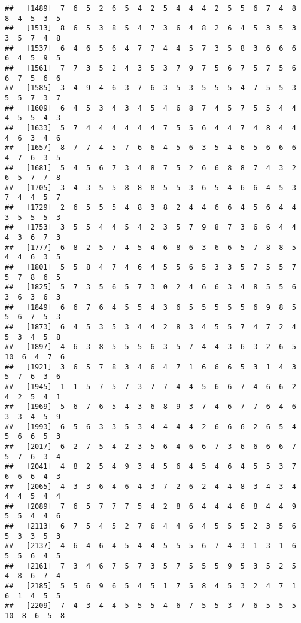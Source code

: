 \documentclass[
]{book}
\begin{document}
\begin{verbatim}
##   [1489]  7  6  5  2  6  5  4  2  5  4  4  4  2  5  5  6  7  4  8  8  4  5  3  5
##   [1513]  8  6  5  3  8  5  4  7  3  6  4  8  2  6  4  5  3  5  3  3  5  7  4  8
##   [1537]  6  4  6  5  6  4  7  7  4  4  5  7  3  5  8  3  6  6  6  6  4  5  9  5
##   [1561]  7  7  3  5  2  4  3  5  3  7  9  7  5  6  7  5  7  5  6  6  7  5  6  6
##   [1585]  3  4  9  4  6  3  7  6  3  5  3  5  5  5  4  7  5  5  3  5  5  7  3  7
##   [1609]  6  4  5  3  4  3  4  5  4  6  8  7  4  5  7  5  5  4  4  4  5  5  4  3
##   [1633]  5  7  4  4  4  4  4  4  7  5  5  6  4  4  7  4  8  4  4  4  6  3  4  6
##   [1657]  8  7  7  4  5  7  6  6  4  5  6  3  5  4  6  5  6  6  6  4  7  6  3  5
##   [1681]  5  4  5  6  7  3  4  8  7  5  2  6  6  8  8  7  4  3  2  6  5  7  7  8
##   [1705]  3  4  3  5  5  8  8  8  5  5  3  6  5  4  6  6  4  5  3  7  4  4  5  7
##   [1729]  2  6  5  5  5  4  8  3  8  2  4  4  6  6  4  5  6  4  4  3  5  5  5  3
##   [1753]  3  5  5  4  4  5  4  2  3  5  7  9  8  7  3  6  6  4  4  4  3  6  7  3
##   [1777]  6  8  2  5  7  4  5  4  6  8  6  3  6  6  5  7  8  8  5  4  4  6  3  5
##   [1801]  5  5  8  4  7  4  6  4  5  5  6  5  3  3  5  7  5  5  7  5  7  8  6  5
##   [1825]  5  7  3  5  6  5  7  3  0  2  4  6  6  3  4  8  5  5  6  3  6  3  6  3
##   [1849]  6  6  7  6  4  5  5  4  3  6  5  5  5  5  5  6  9  8  5  5  6  7  5  3
##   [1873]  6  4  5  3  5  3  4  4  2  8  3  4  5  5  7  4  7  2  4  5  3  4  5  8
##   [1897]  4  6  3  8  5  5  5  6  3  5  7  4  4  3  6  3  2  6  5 10  6  4  7  6
##   [1921]  3  6  5  7  8  3  4  6  4  7  1  6  6  6  5  3  1  4  3  5  7  6  3  6
##   [1945]  1  1  5  7  5  7  3  7  7  4  4  5  6  6  7  4  6  6  2  4  2  5  4  1
##   [1969]  5  6  7  6  5  4  3  6  8  9  3  7  4  6  7  7  6  4  6  3  3  4  5  9
##   [1993]  6  5  6  3  3  5  3  4  4  4  4  2  6  6  6  2  6  5  4  5  6  6  5  3
##   [2017]  6  2  7  5  4  2  3  5  6  4  6  6  7  3  6  6  6  6  7  5  7  6  3  4
##   [2041]  4  8  2  5  4  9  3  4  5  6  4  5  4  6  4  5  5  3  7  6  6  6  4  3
##   [2065]  4  3  3  6  4  6  4  3  7  2  6  2  4  4  8  3  4  3  4  4  4  5  4  4
##   [2089]  7  6  5  7  7  7  5  4  2  8  6  4  4  4  6  8  4  4  9  5  5  4  4  6
##   [2113]  6  7  5  4  5  2  7  6  4  4  6  4  5  5  5  2  3  5  6  5  3  3  5  3
##   [2137]  4  6  4  6  4  5  4  4  5  5  5  6  7  4  3  1  3  1  6  5  5  6  4  5
##   [2161]  7  3  4  6  7  5  7  3  5  7  5  5  5  9  5  3  5  2  5  4  8  6  7  4
##   [2185]  5  5  6  9  6  5  4  5  1  7  5  8  4  5  3  2  4  7  1  6  1  4  5  5
##   [2209]  7  4  3  4  4  5  5  5  4  6  7  5  5  3  7  6  5  5  5 10  8  6  5  8

\end{verbatim}
\end{document}
